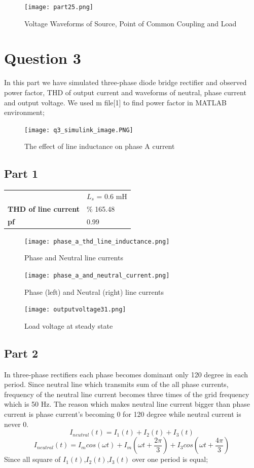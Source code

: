 \documentclass[fleqn, a4paper]{report}
\begin{document}
\begin{figure}[H]
  \texttt{[image: part25.png]}
  \caption{Voltage Waveforms of Source, Point of Common Coupling and Load}
  \label{fig:simulink3}
\end{figure}


\section*{Question 3}
In this part we have simulated three-phase diode bridge rectifier and observed power factor, THD of output current and waveforms of neutral, phase current and output voltage. We used m file[1] to find power factor in MATLAB environment;
\begin{figure}[H]
  \texttt{[image: q3\_simulink\_image.PNG]}
  \caption{The effect of line inductance on phase A current}
  \label{fig:simulink3}
\end{figure}
\subsection*{Part 1}
\begin{table}[H]
\centering
\begin{tabular}{ll}
\textbf{}                    & $L_s$ = 0.6 mH \\
\textbf{THD of line current} & \% 165.48      \\
\textbf{pf}                  & 0.99          
\end{tabular}
\end{table}
\begin{figure}[H]
\centering
  \texttt{[image: phase\_a\_thd\_line\_inductance.png]}
  \caption{Phase and Neutral line currents}
  \label{fig:simulink3}
\end{figure}
\begin{figure}[H]
  \texttt{[image: phase\_a\_and\_neutral\_current.png]}
  \caption{Phase (left) and Neutral (right) line currents}
  \label{fig:simulink3}
\end{figure}

\begin{figure}[H]
  \texttt{[image: outputvoltage31.png]}
  \caption{Load voltage at steady state}
  \label{fig:simulink3}
\end{figure}
\subsection*{Part 2}

In three-phase rectifiers each phase becomes dominant only 120 degree in each period. Since neutral line which transmits sum of the all phase currents, frequency of the neutral line current becomes three times of the grid frequency which is 50 Hz. The reason which makes neutral line current bigger than phase current is phase current's becoming 0 for 120 degree while neutral current is never 0.
$$I_{neutral}(t)=I_1(t)+I_2(t)+I_3(t)$$
$$I_{neutral}(t)=I_mcos(\omega t)+I_m(\omega t +\frac{2\pi}{3})+I_3cos(\omega t + \frac{4\pi}{3})$$
Since all square of $I_1(t)$,$I_2(t)$,$I_3(t)$ over one period is equal;
\end{document}
